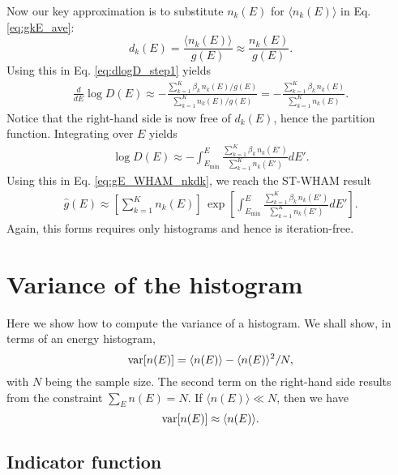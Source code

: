 \documentclass[aip,jcp,preprint,superscriptaddress]{revtex4-1}
\begin{document}
Now our key approximation
is to substitute $n_k(E)$ for $\langle n_k(E) \rangle$
in Eq. \eqref{eq:gkE_ave}:
%
\begin{equation}
  d_k(E)
  =
  \frac{ \langle n_k(E) \rangle } { g(E) }
  \approx
  \frac{ n_k(E) } { g(E) }.
  \label{eq:dkE_approx}
\end{equation}
%
Using this in Eq. \eqref{eq:dlogD_step1} yields
%
\begin{align*}
\frac{d}{dE} \log D(E)
\approx
-\frac{ \sum_{k = 1}^K \beta_k \, n_k(E) / g(E) }
{ \sum_{k = 1}^K n_k(E) / g(E) }
=
-\frac{ \sum_{k = 1}^K \beta_k \, n_k(E) }
{ \sum_{k = 1}^K n_k(E) }.
\end{align*}
%
Notice that the right-hand side
is now free of $d_k(E)$, hence the partition function.
%
Integrating over $E$ yields
%
\begin{align*}
\log D(E)
\approx
-\int^E_{E_{\min}} \frac{ \sum_{k = 1}^K \beta_k \, n_k(E') }
{ \sum_{k = 1}^K n_k(E') } dE'.
\end{align*}
%
Using this in Eq. \eqref{eq:gE_WHAM_nkdk},
we reach the ST-WHAM result
\begin{align}
\hat g(E)
\approx
\left[
  \sum_{k = 1}^K n_k(E)
\right]
\,
\exp
\left[
\int^E_{E_{\min}}
    \frac{ \sum_{k = 1}^K \beta_k \, n_k(E') }
         { \sum_{k = 1}^K n_k(E') }
  dE'
\right].
\label{eq:g_STWHAM}
\end{align}
%
Again, this forms requires
only histograms
and hence is iteration-free.






\appendix



\section{\label{sec:varhist}
Variance of the histogram}



Here we show how to compute
the variance of a histogram.
%
We shall show,
in terms of an energy histogram,
\[
  \mathrm{var}[ n(E) ] = \langle n(E) \rangle -  \langle n(E) \rangle^2/N,
\]
with $N$ being the sample size.
%
The second term on the right-hand side
results from the constraint $\sum_E n(E) = N$.
%
If $\langle n(E) \rangle \ll N$,
then we have
\[
  \mathrm{var}[ n(E) ] \approx \langle n(E) \rangle.
\]



\subsection{Indicator function}
\end{document}
